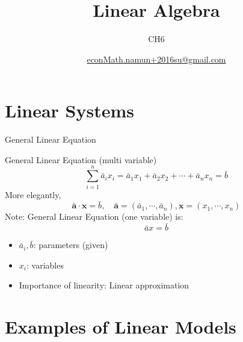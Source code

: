 \documentclass[final]{beamer}
\author[조남운]{\url{econMath.namun+2016su@gmail.com}}
\title{Linear Algebra}
\subtitle{CH6}
\begin{document}
	
\maketitle


\section{Linear Systems} %
\label{sec:linear_systems}
\begin{frame}[t]{General Linear Equation}
	\begin{block}
		{General Linear Equation (multi variable)}
		\[
			\sum_{i=1}^n \bar a_i x_i = \bar a_1 x_1 + \bar a_2 x_2 + \cdots + \bar a_n x_n = \bar b
		\]
		More elegantly,
		\[
			\bar{\mathbf{a}}\cdot \mathbf{x} = \bar b ,\quad \bar{\mathbf{a}}=(\bar a_1 ,\cdots,\bar a_n), \mathbf{x}=(x_1,\cdots,x_n)
		\]
		Note: General Linear Equation (one variable) is:
		\[
			\bar a x = \bar b
		\]
	\end{block}
	\begin{itemize}
		\item $\bar a_i, \bar b$: parameters (given)
		\item $x_i$: variables
		\item Importance of linearity: Linear approximation
	\end{itemize}
\end{frame}


\section{Examples of Linear Models} %
\label{sec:examples_of_linear_models}
\end{document}
